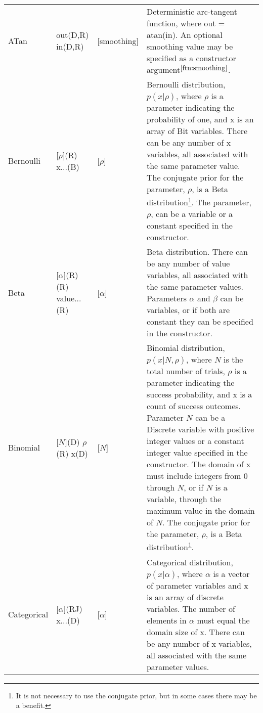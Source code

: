 \begin{longtable} {p{3.5cm} p{2.2cm} p{2cm} p{7cm}}
%
ATan & out(D,R) \newline in(D,R) & [smoothing] & Deterministic arc-tangent function, where out = atan(in). An optional smoothing value may be specified as a constructor argument$^{\ref{ftn:smoothing}}$. \\
%
Bernoulli & [$\rho$](R) \newline x...(B) & [$\rho$] & Bernoulli distribution, $p(x|\rho)$, where $\rho$ is a parameter indicating the probability of one, and x is an array of Bit variables.  There can be any number of x variables, all associated with the same parameter value. The conjugate prior for the parameter, $\rho$, is a Beta distribution\footnote{\label{ftn:conugatePrior}It is not necessary to use the conjugate prior, but in some cases there may be a benefit.}. The parameter, $\rho$, can be a variable or a constant specified in the constructor.\\
%
Beta & [$\alpha$](R) \newline [$\beta$](R) \newline value...(R) & [$\alpha$] \newline [$\beta$] & Beta distribution. There can be any number of value variables, all associated with the same parameter values.  Parameters $\alpha$ and $\beta$ can be variables, or if both are constant they can be specified in the constructor. \\
%
Binomial & [$N$](D) \newline $\rho$(R) \newline x(D) & [$N$] & Binomial distribution, $p(x|N, \rho)$, where $N$ is the total number of trials, $\rho$ is a parameter indicating the success probability, and x is a count of success outcomes.  Parameter $N$ can be a Discrete variable with positive integer values or a constant integer value specified in the constructor.  The domain of x must include integers from 0 through $N$, or if $N$ is a variable, through the maximum value in the domain of $N$.  The conjugate prior for the parameter, $\rho$, is a Beta distribution\textsuperscript{\ref{ftn:conugatePrior}}. \\
%
Categorical & [$\alpha$](RJ)  \newline x...(D) & [$\alpha$] & Categorical distribution, $p(x | \alpha)$, where $\alpha$ is a vector of parameter variables and x is an array of discrete variables.  The number of elements in $\alpha$ must equal the domain size of x.  There can be any number of x variables, all associated with the same parameter values.  \newline

\end{longtable}
